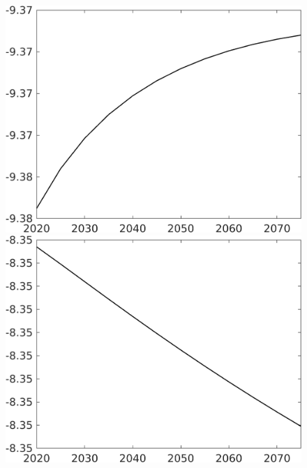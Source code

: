 \documentclass[12pt]{article}
\begin{document}
\begin{figure}[h!!]
\begin{minipage}[]{0.32\textwidth}
	\end{minipage}	
	\begin{minipage}[]{0.32\textwidth}
		\includegraphics[width=1\textwidth]{../../codding_model/own_basedOnFried/optimalPol_010922_revision/figures/all_13Sept22/CompTaul_LFBAUPer_Reg0_Lg_spillover0_nsk0_xgr1_knspil0_sep1_countec0_GovRev0_etaa0.79.png}
	\end{minipage}	
	\begin{minipage}[]{0.32\textwidth}
		\includegraphics[width=1\textwidth]{../../codding_model/own_basedOnFried/optimalPol_010922_revision/figures/all_13Sept22/CompTaul_LFBAUPer_Reg0_Ln_spillover0_nsk0_xgr1_knspil0_sep1_countec0_GovRev0_etaa0.79.png}
	\end{minipage}	
\end{figure}
\end{document}
